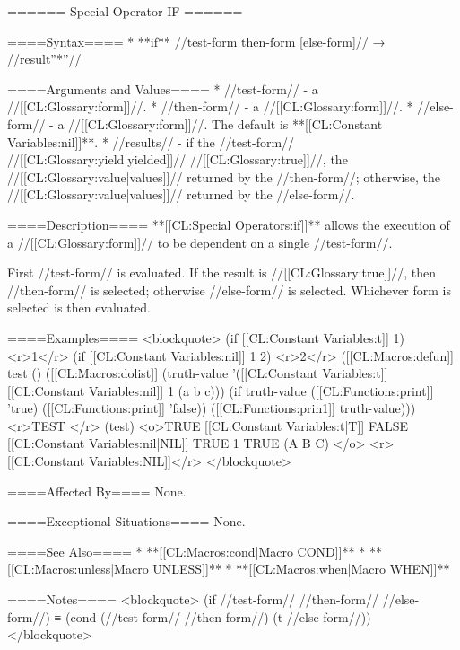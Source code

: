 ====== Special Operator IF ======

====Syntax====
  * **if** //test-form then-form [else-form]// → //result''*''//

====Arguments and Values====
  * //test-form// - a //[[CL:Glossary:form]]//.
  * //then-form// - a //[[CL:Glossary:form]]//.
  * //else-form// - a //[[CL:Glossary:form]]//. The default is **[[CL:Constant Variables:nil]]**.
  * //results// - if the //test-form// //[[CL:Glossary:yield|yielded]]// //[[CL:Glossary:true]]//, the //[[CL:Glossary:value|values]]// returned by the //then-form//; otherwise, the //[[CL:Glossary:value|values]]// returned by the //else-form//.

====Description====
**[[CL:Special Operators:if]]** allows the execution of a //[[CL:Glossary:form]]// to be dependent on a single //test-form//.

First //test-form// is evaluated. If the result is //[[CL:Glossary:true]]//, then //then-form// is selected; otherwise //else-form// is selected. Whichever form is selected is then evaluated.

====Examples====
<blockquote>
(if [[CL:Constant Variables:t]] 1) <r>1</r>
(if [[CL:Constant Variables:nil]] 1 2) <r>2</r>
([[CL:Macros:defun]] test () 
  ([[CL:Macros:dolist]] (truth-value '([[CL:Constant Variables:t]] [[CL:Constant Variables:nil]] 1 (a b c)))
    (if truth-value 
        ([[CL:Functions:print]] 'true)
        ([[CL:Functions:print]] 'false))
    ([[CL:Functions:prin1]] truth-value))) <r>TEST </r>
(test)
<o>TRUE [[CL:Constant Variables:t|T]]
FALSE [[CL:Constant Variables:nil|NIL]]
TRUE 1
TRUE (A B C) </o>
<r>[[CL:Constant Variables:NIL]]</r>
</blockquote>

====Affected By====
None.

====Exceptional Situations====
None.

====See Also====
  * **[[CL:Macros:cond|Macro COND]]**
  * **[[CL:Macros:unless|Macro UNLESS]]**
  * **[[CL:Macros:when|Macro WHEN]]**

====Notes====
<blockquote>
(if //test-form// //then-form// //else-form//) 
  ≡ (cond (//test-form// //then-form//) (t //else-form//))
</blockquote>

